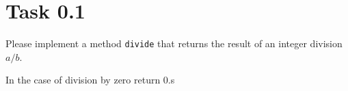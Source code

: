 \documentclass[12pt]{article}
\begin{document}
\maketitle

\section{Task 0.1}
Please implement a method \verb+divide+ that returns the result of an integer division $a/b$.

In the case of division by zero return 0.s
\end{document}
